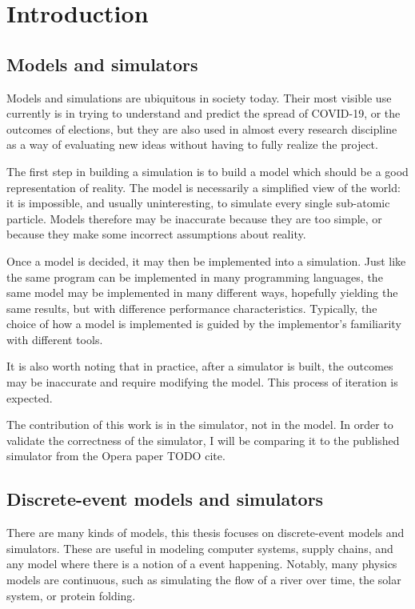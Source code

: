 \chapter{Introduction} \label{intro}


\section{Models and simulators} \label{models-and-sims}

Models and simulations are ubiquitous in society today.
Their most visible use currently is in trying to understand and predict the spread of COVID-19, or the outcomes of elections, but they are also used in almost every research discipline as a way of evaluating new ideas without having to fully realize the project.

The first step in building a simulation is to build a model which should be a good representation of reality.
The model is necessarily a simplified view of the world: it is impossible, and usually uninteresting, to simulate every single sub-atomic particle.
Models therefore may be inaccurate because they are too simple, or because they make some incorrect assumptions about reality.

Once a model is decided, it may then be implemented into a simulation.
Just like the same program can be implemented in many programming languages, the same model may be implemented in many different ways, hopefully yielding the same results, but with difference performance characteristics.
Typically, the choice of how a model is implemented is guided by the implementor's familiarity with different tools.

It is also worth noting that in practice, after a simulator is built, the outcomes may be inaccurate and require modifying the model.
This process of iteration is expected.

The contribution of this work is in the simulator, not in the model.
In order to validate the correctness of the simulator, I will be comparing it to the published simulator from the Opera paper TODO cite.

\section{Discrete-event models and simulators} \label{discrete-event-sims}

There are many kinds of models, this thesis focuses on discrete-event models and simulators.
These are useful in modeling computer systems, supply chains, and any model where there is a notion of a event happening.
Notably, many physics models are continuous, such as simulating the flow of a river over time, the solar system, or protein folding.

